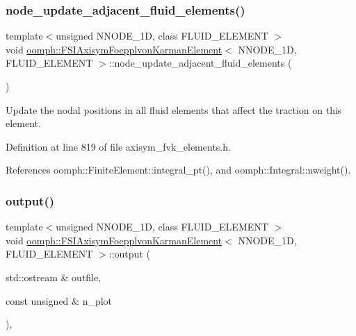 \subsubsection{\texorpdfstring{node\+\_\+update\+\_\+adjacent\+\_\+fluid\+\_\+elements()}{node\_update\_adjacent\_fluid\_elements()}}
{\footnotesize\ttfamily template$<$unsigned N\+N\+O\+D\+E\+\_\+1D, class F\+L\+U\+I\+D\+\_\+\+E\+L\+E\+M\+E\+NT $>$ \\
void \hyperlink{classoomph_1_1FSIAxisymFoepplvonKarmanElement}{oomph\+::\+F\+S\+I\+Axisym\+Foepplvon\+Karman\+Element}$<$ N\+N\+O\+D\+E\+\_\+1D, F\+L\+U\+I\+D\+\_\+\+E\+L\+E\+M\+E\+NT $>$\+::node\+\_\+update\+\_\+adjacent\+\_\+fluid\+\_\+elements (\begin{DoxyParamCaption}{ }\end{DoxyParamCaption})\hspace{0.3cm}{\ttfamily [inline]}}



Update the nodal positions in all fluid elements that affect the traction on this element. 



Definition at line 819 of file axisym\+\_\+fvk\+\_\+elements.\+h.



References oomph\+::\+Finite\+Element\+::integral\+\_\+pt(), and oomph\+::\+Integral\+::nweight().

\mbox{\label{classoomph_1_1FSIAxisymFoepplvonKarmanElement_a03c82e935db8c1c93dfe2f443ec5e817}} 
\subsubsection{\texorpdfstring{output()}{output()}}
{\footnotesize\ttfamily template$<$unsigned N\+N\+O\+D\+E\+\_\+1D, class F\+L\+U\+I\+D\+\_\+\+E\+L\+E\+M\+E\+NT $>$ \\
void \hyperlink{classoomph_1_1FSIAxisymFoepplvonKarmanElement}{oomph\+::\+F\+S\+I\+Axisym\+Foepplvon\+Karman\+Element}$<$ N\+N\+O\+D\+E\+\_\+1D, F\+L\+U\+I\+D\+\_\+\+E\+L\+E\+M\+E\+NT $>$\+::output (\begin{DoxyParamCaption}\item[{std\+::ostream \&}]{outfile,  }\item[{const unsigned \&}]{n\+\_\+plot }\end{DoxyParamCaption})\hspace{0.3cm}{\ttfamily [inline]}, {\ttfamily [virtual]}}



